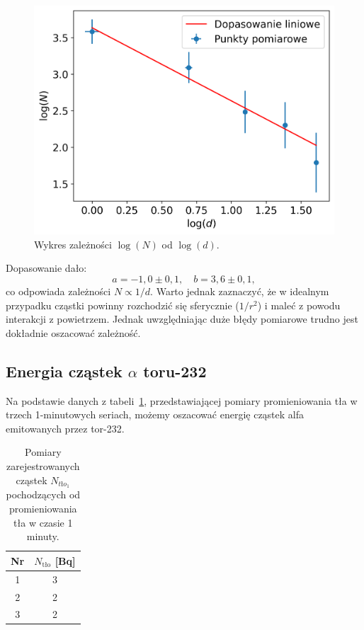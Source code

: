 \documentclass[12pt]{article}
\begin{document}
\begin{figure}[H]
	\centering
	\includegraphics[scale=0.68]{distance_log}
	\caption{Wykres zależności $\log(N)$ od $\log(d)$.}
	\label{fig:distance_log}
\end{figure}

Dopasowanie dało:
\begin{equation}
	a = -1{,}0 \pm 0{,}1,
	\quad
	b = 3{,}6 \pm 0{,}1,
	\label{eq:linefit}
\end{equation}
co odpowiada zależności \(N \propto 1/d\). Warto jednak zaznaczyć, że w idealnym przypadku cząstki powinny rozchodzić się sferycznie (\(1/r^2\)) i maleć z powodu interakcji z powietrzem. Jednak uwzględniając duże błędy pomiarowe trudno jest dokładnie oszacować zależność.

\subsection{Energia cząstek \(\alpha\) toru-232}

Na podstawie danych z tabeli~\ref{tab:background}, przedstawiającej pomiary promieniowania tła w trzech 1-minutowych seriach, możemy oszacować energię cząstek alfa emitowanych przez tor-232.
\begin{table}[H]
	\centering
	\begin{tabular}{c|c}
		\toprule
		Nr & $N_{\text{tło}}$ [Bq] \\
		\midrule
		1  & 3                     \\
		2  & 2                     \\
		3  & 2                     \\
		\bottomrule
	\end{tabular}
	\caption{Pomiary zarejestrowanych cząstek \(N_{tło_1}\) pochodzących od promieniowania tła w czasie 1 minuty.}
	\label{tab:background}
\end{table}
\end{document}
